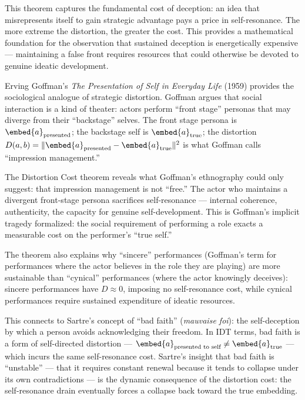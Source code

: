 \begin{interpretation}
This theorem captures the fundamental cost of deception: an idea that
misrepresents itself to gain strategic advantage pays a price in
self-resonance.  The more extreme the distortion, the greater the cost.
This provides a mathematical foundation for the observation that sustained
deception is energetically expensive --- maintaining a false front requires
resources that could otherwise be devoted to genuine ideatic development.
\end{interpretation}

\begin{interpretation}
\label{interp:ch20:goffman_presentation}
Erving Goffman's \textit{The Presentation of Self in Everyday Life} (1959)
provides the sociological analogue of strategic distortion.  Goffman argues
that social interaction is a kind of theater: actors perform ``front
stage'' personas that may diverge from their ``backstage'' selves.  The
front stage persona is $\embed{a}_{\text{presented}}$; the backstage self
is $\embed{a}_{\text{true}}$; the distortion $D(a,b) = \|\embed{a}_{\text{presented}} -
\embed{a}_{\text{true}}\|^2$ is what Goffman calls ``impression management.''

The Distortion Cost theorem reveals what Goffman's ethnography could only
suggest: that impression management is not ``free.''  The actor who
maintains a divergent front-stage persona sacrifices self-resonance ---
internal coherence, authenticity, the capacity for genuine self-development.
This is Goffman's implicit tragedy formalized: the social requirement of
performing a role exacts a measurable cost on the performer's ``true self.''

The theorem also explains why ``sincere'' performances (Goffman's term for
performances where the actor believes in the role they are playing) are
more sustainable than ``cynical'' performances (where the actor knowingly
deceives): sincere performances have $D \approx 0$, imposing no
self-resonance cost, while cynical performances require sustained
expenditure of ideatic resources.

This connects to Sartre's concept of ``bad faith'' (\textit{mauvaise foi}):
the self-deception by which a person avoids acknowledging their freedom.
In IDT terms, bad faith is a form of self-directed distortion ---
$\embed{a}_{\text{presented to self}} \neq \embed{a}_{\text{true}}$ ---
which incurs the same self-resonance cost.  Sartre's insight that bad
faith is ``unstable'' --- that it requires constant renewal because it
tends to collapse under its own contradictions --- is the dynamic
consequence of the distortion cost: the self-resonance drain eventually
forces a collapse back toward the true embedding.
\end{interpretation}

